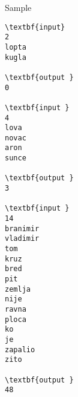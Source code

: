 Sample
\begin{verbatim}
\textbf{input}  
2 
lopta 
kugla 
 
\textbf{output }
0

\textbf{input } 
4 
lova 
novac 
aron 
sunce 
 
\textbf{output }
3

\textbf{input } 
14 
branimir 
vladimir 
tom 
kruz 
bred 
pit 
zemlja 
nije 
ravna 
ploca 
ko 
je 
zapalio 
zito 
 
\textbf{output } 
48
\end{verbatim}